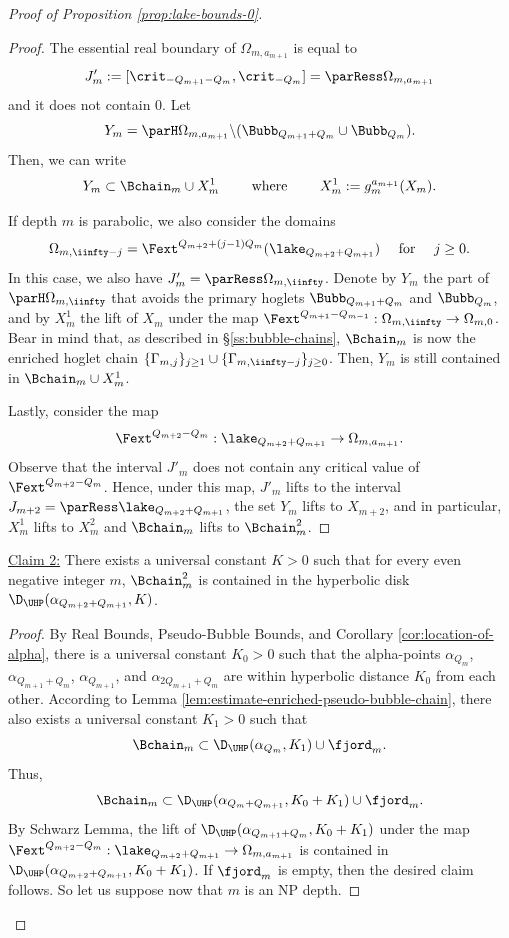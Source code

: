 \documentclass{amsart}
\begin{document}
\begin{proof}[Proof of Proposition \ref{prop:lake-bounds-0}]
\begin{proof}
    The essential real boundary of $\Omega_{m,a_{m+1}}$ is equal to
    \[
        J'_{m} := [\crit_{-Q_{m+1}-Q_m}, \crit_{-Q_m}] = \parRess \Omega_{m,a_{m+1}}
    \]
    and it does not contain $0$.
    Let 
    \[
        Y_m = \parH \Omega_{m,a_{m+1}} \backslash (\Bubb_{Q_{m+1}+Q_m} \cup \Bubb_{Q_m}). 
    \]
    Then, we can write
    \[
        Y_{m} \subset \Bchain_m \cup X_{m}^1 \qquad \text{ where } \qquad X_{m}^1 := g_m^{a_{m+1}}(X_m).
    \]
    
    If depth $m$ is parabolic, we also consider the domains 
    \[
    \Omega_{m,\iinfty-j} = \Fext^{Q_{m+2}+(j-1)Q_m}(\lake_{Q_{m+2}+Q_{m+1}}) \quad \text{ for } \quad j \geq 0.
    \]
    In this case, we also have $J'_{m} = \parRess \Omega_{m,\iinfty}$. 
    Denote by $Y_m$ the part of $\parH \Omega_{m, \iinfty}$ that avoids the primary hoglets $\Bubb_{Q_{m+1}+Q_m}$ and $\Bubb_{Q_m}$, and by $X_m^1$ the lift of $X_m$ under the map $\Fext^{Q_{m+1}-Q_{m-1}}: \Omega_{m,\iinfty} \to \Omega_{m,0}$. 
    Bear in mind that, as described in \S\ref{ss:bubble-chains}, $\Bchain_m$ is now the enriched hoglet chain $\{\Gamma_{m,j}\}_{j \geq 1} \cup \{\Gamma_{m,\iinfty-j}\}_{j\geq 0}$.
    Then, $Y_m$ is still contained in $\Bchain_m \cup X_m^1$.
    
    Lastly, consider the map 
    \[
    \Fext^{Q_{m+2}-Q_m} : \lake_{Q_{m+2}+Q_{m+1}} \to \Omega_{m,a_{m+1}}.
    \]
    Observe that the interval $J'_m$ does not contain any critical value of $\Fext^{Q_{m+2}-Q_m}$. 
    Hence, under this map, $J'_m$ lifts to the interval $J_{m+2}=\parRess \lake_{Q_{m+2}+Q_{m+1}}$, the set $Y_{m}$ lifts to $X_{m+2}$, and in particular, $X_m^1$ lifts to $X_m^2$ and $\Bchain_m$ lifts to $\Bchain_m^2$.
    \end{proof}

    \noindent \underline{Claim 2:} There exists a universal constant $K>0$ such that for every even negative integer $m$,  $\Bchain_m^2$ is contained in the hyperbolic disk $\D_{\UHP}(\alpha_{Q_{m+2}+Q_{m+1}}, K)$.

    \begin{proof}
        By Real Bounds, Pseudo-Bubble Bounds, and Corollary \ref{cor:location-of-alpha}, there is a universal constant $K_0>0$ such that the alpha-points $\alpha_{Q_m}$, $\alpha_{Q_{m+1}+Q_m}$, $\alpha_{Q_{m+1}}$, and $\alpha_{2Q_{m+1}+Q_m}$ are within hyperbolic distance $K_0$ from each other.
        According to Lemma \ref{lem:estimate-enriched-pseudo-bubble-chain}, there also exists a universal constant $K_1>0$ such that 
        \[
            \Bchain_m \subset \D_\UHP(\alpha_{Q_m}, K_1) \cup \fjord_m.
        \]
        Thus,
        \[
            \Bchain_m \subset \D_\UHP(\alpha_{Q_m+Q_{m+1}}, K_0+K_1) \cup \fjord_m.
        \]
        By Schwarz Lemma, the lift of $\D_\UHP(\alpha_{Q_{m+1}+Q_m}, K_0+K_1)$ under the map $\Fext^{Q_{m+2}-Q_m}: \lake_{Q_{m+2}+Q_{m+1}} \to \Omega_{m,a_{m+1}}$
        is contained in $\D_{\UHP}(\alpha_{Q_{m+2}+Q_{m+1}}, K_0+ K_1)$.
        If $\fjord_m$ is empty, then the desired claim follows.
        So let us suppose now that $m$ is an NP depth.
        

\end{proof}
\end{proof}
\end{document}

